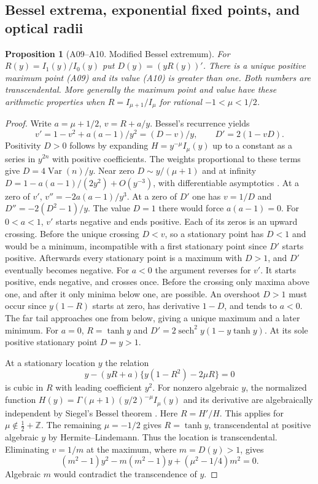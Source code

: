 \documentclass[11pt,a4paper]{article}
\newtheorem{proposition}[theorem]{Proposition}
\theoremstyle{definition}
\theoremstyle{remark}
\begin{document}
\subsection{Bessel extrema, exponential fixed points, and optical radii}
\par\hypertarget{cat-A09}{}\label{page:A09}\hypertarget{cat-A10}{}\label{page:A10}
\begin{proposition}[A09--A10. Modified Bessel extremum]
For $R(y)=I_1(y)/I_0(y)$ put $D(y)=(yR(y))'$. There is a unique
positive maximum point (A09) and its value (A10) is greater than one.
Both numbers are transcendental. More generally the maximum point and
value have these arithmetic properties when
$R=I_{\mu+1}/I_\mu$ for rational $-1<\mu<1/2$.
\end{proposition}
\begin{proof}
Write $a=\mu+1/2$, $v=R+a/y$. Bessel's recurrence yields
\[
 v'=1-v^2+a(a-1)/y^2=(D-v)/y,\qquad D'=2(1-vD).
\]
Positivity $D>0$ follows by expanding $H=y^{-\mu}I_\mu(y)$ up to a
constant as a series in $y^{2n}$ with positive coefficients. The weights
proportional to these terms give $D=4\operatorname{Var}(n)/y$.
Near zero $D\sim y/(\mu+1)$ and at infinity
$D=1-a(a-1)/(2y^2)+O(y^{-3})$, with differentiable asymptotics
\cite[\S10.40]{aDLMF}. At a zero of $v'$,
$v''=-2a(a-1)/y^3$. At a zero of $D'$ one has $v=1/D$ and
$D''=-2(D^2-1)/y$. The value $D=1$ there would force $a(a-1)=0$.
For $0<a<1$, $v'$ starts negative and ends positive. Each of its
zeros is an upward crossing. Before the unique crossing $D<v$, so a
stationary point has $D<1$ and would be a minimum, incompatible with
a first stationary point since $D'$ starts positive. Afterwards every
stationary point is a maximum with $D>1$, and $D'$ eventually becomes
negative. For $a<0$ the argument reverses for $v'$. It starts positive,
ends negative, and crosses once. Before the crossing only maxima above
one, and after it only minima below one, are possible. An overshoot
$D>1$ must occur since $y(1-R)$ starts at zero, has derivative $1-D$,
and tends to $a<0$. The far tail approaches one from below, giving a
unique maximum and a later minimum. For $a=0$, $R=\tanh y$ and
$D'=2\operatorname{sech}^2 y(1-y\tanh y)$. At its sole positive stationary point $D=y>1$.

At a stationary location $y$ the relation
\[
 y-(yR+a)\{y(1-R^2)-2\mu R\}=0
\]
is cubic in $R$ with leading coefficient $y^2$. For nonzero algebraic
$y$, the normalized function $H(y)=\Gamma(\mu+1)(y/2)^{-\mu}I_\mu(y)$ and its derivative are
algebraically independent by Siegel's Bessel theorem
\cite{aSiegel,aFeld}. Here $R=H'/H$. This applies for
$\mu\notin\tfrac12+\mathbb Z$. The remaining $\mu=-1/2$ gives
$R=\tanh y$, transcendental at positive algebraic $y$ by
Hermite--Lindemann. Thus the location is transcendental. Eliminating
$v=1/m$ at the maximum, where $m=D(y)>1$, gives
\[
 (m^2-1)y^2-m(m^2-1)y+(\mu^2-1/4)m^2=0.
\]
Algebraic $m$ would contradict the transcendence of $y$.
\end{proof}
\end{document}
